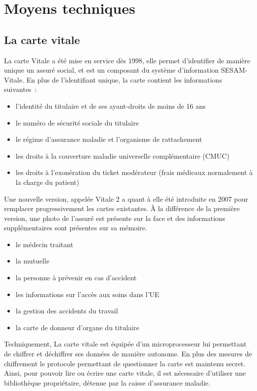     \section{Moyens techniques}

    \subsection{La carte vitale}

    La carte Vitale a été mise en service dès 1998, elle permet d'identifier de manière unique un assuré social, et est un composant du
    système d'information SESAM-Vitale. En plus de l'identifiant unique, la carte contient
    les informations suivantes~:

    \begin{itemize}
        \item l'identité du titulaire et de ses ayant-droits de moins de 16 ans
        \item le numéro de sécurité sociale du titulaire
        \item le régime d'assurance maladie et l'organisme de rattachement
        \item les droits à la couverture maladie universelle complémentaire (CMUC)
        \item les droits à l'exonération du ticket modérateur (frais médicaux normalement à la charge du patient)
    \end{itemize}

        Une nouvelle version, appelée Vitale 2
    a quant à elle été introduite en 2007 pour remplacer progressivement les cartes existantes.
    À la différence de la première version, une photo de l'assuré est présente sur la face et des
    informations supplémentaires sont présentes sur sa mémoire.

    \begin{itemize}
        \item le médecin traitant
        \item la mutuelle
        \item la personne à prévenir en cas d'accident
        \item les informations sur l'accès aux soins dans l'UE
        \item la gestion des accidents du travail
        \item la carte de donneur d'organe du titulaire
    \end{itemize}

    Techniquement, La carte vitale est équipée d'un microprocesseur lui permettant de chiffrer et
    déchiffrer ses données de manière autonome. En plus des mesures de chiffrement le protocole
    permettant de questionner la carte est maintenu secret. Ainsi, pour pouvoir lire ou écrire une carte vitale,
    il est nécessaire d'utiliser une bibliothèque propriétaire, détenue par la caisse d'assurance maladie.

